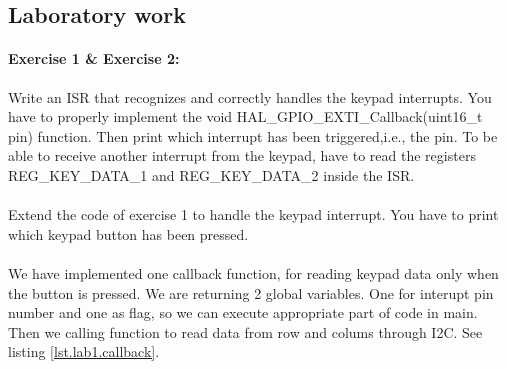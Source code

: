 \documentclass[english]{article}
\begin{document}
	\subsection{Laboratory work}







		\paragraph{Exercise 1 \& Exercise 2:}
		Write an ISR that recognizes and correctly handles the keypad interrupts. You have to properly implement the
		void HAL\_GPIO\_EXTI\_Callback(uint16\_t pin) function. Then print which interrupt has been triggered,i.e.,
		the pin. To be able to receive another interrupt from the keypad, have to read the registers REG\_KEY\_DATA\_1
		and REG\_KEY\_DATA\_2 inside the ISR.

		\paragraph{}
		Extend the code of exercise 1 to handle the keypad interrupt. You have to print which keypad button has been
		pressed.

		\paragraph{}
		We have implemented one callback function, for reading keypad data only when the button is pressed. We are returning
		2 global variables. One for interupt pin number and one as flag, so we can execute appropriate part of code in main.
		Then we calling function to read data from row and colums through I2C. See listing \ref{lst.lab1.callback}.
\end{document}

